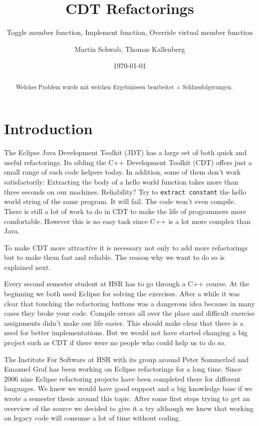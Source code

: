 \documentclass[a4paper,10pt,abstract=on]{scrreprt}
\title{CDT Refactorings}
\subtitle{Toggle member function, Implement function, Override virtual member function}
\date{\today}
\author{Martin Schwab, Thomas Kallenberg}
\begin{document}
\maketitle
{}
\begin{abstract}
Welches Problem wurde mit welchen Ergebinissen bearbeitet + Schlussfolgerungen.
\end{abstract}
\tableofcontents


\chapter{Introduction}
The Eclipse Java Development Toolkit (JDT) has a large set of both quick and useful refactorings. Its sibling the C++ Development Toolkit (CDT) offers just a small range of such code helpers today. In addition, some of them don't work satisfactorily: Extracting the body of a hello world function takes more than three seconds on our machines. Reliability? Try to \texttt{extract constant} the hello world string of the same program. It will fail. The code won't even compile. There is still a lot of work to do in CDT to make the life of programmers more comfortable. However this is no easy task since C++ is a lot more complex than Java.

To make CDT more attractive it is necessary not only to add more refactorings but to make them fast and reliable. The reason why we want to do so is explained next.

Every  second semester student at HSR has to go through a C++ course. At the beginning we both used Eclipse for solving the exercises. After a while it was clear that touching the refactoring buttons was a dangerous idea because in many cases they broke your code. Compile errors all over the place and difficult exercise assignments didn't make our life easier. This should make clear that there is a need for better implementations. But we would not have started changing a big project such as CDT if there were no people who could help us to do so.

The  Institute For Software at HSR with its group around Peter Sommerlad and Emanuel Graf has been working on Eclipse refactorings for a long time. Since 2006 nine Eclipse refactoring projects have been completed there for different languages. We knew we would have good support and a big knowledge base if we wrote a semester thesis around this topic. After some first steps trying to get an overview of the source we decided to give it a try although we knew that working on legacy code will consume a lot of time without coding.
\end{document}

